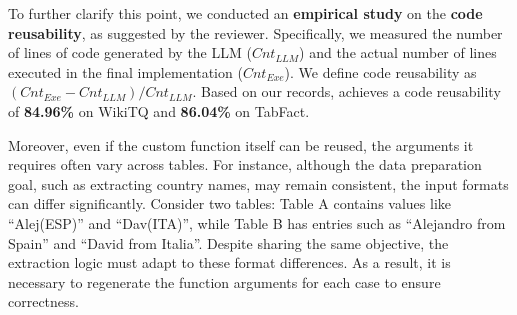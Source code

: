 To further clarify this point, we conducted an \textbf{empirical study} on the \textbf{code reusability}, as suggested by the reviewer. Specifically, we measured the number of lines of code generated by the LLM ($Cnt_{LLM}$) and the actual number of lines executed in the final implementation ($Cnt_{Exe}$). We define code reusability as $(Cnt_{Exe} - Cnt_{LLM}) / Cnt_{LLM}$. Based on our records, \sys achieves a code reusability of \textbf{84.96\%} on WikiTQ and \textbf{86.04\%} on TabFact.


%


Moreover, even if the custom function itself can be reused, the arguments it requires often vary across tables. For instance, although the data preparation goal, such as extracting country names, may remain consistent, the input formats can differ significantly. Consider two tables: Table A contains values like ``Alej(ESP)'' and ``Dav(ITA)'', while Table B has entries such as ``Alejandro from Spain'' and ``David from Italia''. Despite sharing the same objective, the extraction logic must adapt to these format differences. As a result, it is necessary to regenerate the function arguments for each case to ensure correctness.




